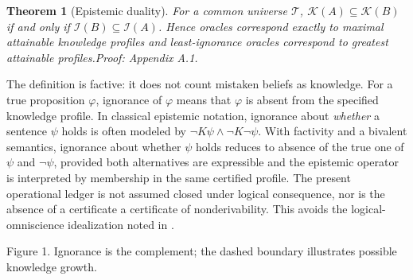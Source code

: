\documentclass[11pt]{article}
\newtheorem{theorem}{Theorem}[section]
\newcommand{\T}{\mathcal T}\newcommand{\K}{\mathcal K}\newcommand{\I}{\mathcal I}\newcommand{\A}{\mathcal A}
\newcommand{\pf}[1]{\unskip\hspace{.6em plus 1fill}\textit{Proof: Appendix A.#1.}}
\begin{document}
\begin{theorem}[Epistemic duality]\label{th:dual}
For a common universe $\T$, $\K(A)\subseteq\K(B)$ if and only if $\I(B)\subseteq\I(A)$. Hence oracles correspond exactly to maximal attainable knowledge profiles and least-ignorance oracles correspond to greatest attainable profiles.\pf{1}
\end{theorem}

The definition is factive: it does not count mistaken beliefs as knowledge. For a true proposition $\varphi$, ignorance of $\varphi$ means that $\varphi$ is absent from the specified knowledge profile. In classical epistemic notation, ignorance about \emph{whether} a sentence $\psi$ holds is often modeled by $\neg K\psi\land\neg K\neg\psi$. With factivity and a bivalent semantics, ignorance about whether $\psi$ holds reduces to absence of the true one of $\psi$ and $\neg\psi$, provided both alternatives are expressible and the epistemic operator is interpreted by membership in the same certified profile. The present operational ledger is not assumed closed under logical consequence, nor is the absence of a certificate a certificate of nonderivability. This avoids the logical-omniscience idealization noted in \cite{dreamer}.

\begin{center}

\small Figure 1. Ignorance is the complement; the dashed boundary illustrates possible knowledge growth.
\end{center}
\end{document}
